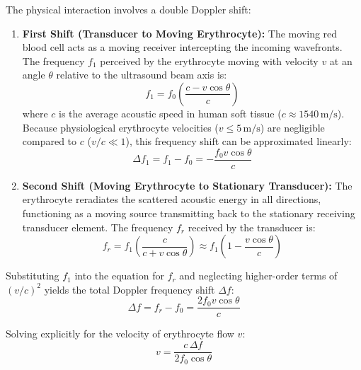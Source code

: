 \documentclass[11pt,a4paper]{article}
\begin{document}
The physical interaction involves a double Doppler shift:
\begin{enumerate}[leftmargin=*]
    \item \textbf{First Shift (Transducer to Moving Erythrocyte):} The moving red blood cell acts as a moving receiver intercepting the incoming wavefronts. The frequency $f_1$ perceived by the erythrocyte moving with velocity $v$ at an angle $\theta$ relative to the ultrasound beam axis is:
    \begin{equation}
        f_1 = f_0 \left( \frac{c - v \cos\theta}{c} \right)
    \end{equation}
    where $c$ is the average acoustic speed in human soft tissue ($c \approx 1540\,\text{m/s}$). Because physiological erythrocyte velocities ($v \le 5\,\text{m/s}$) are negligible compared to $c$ ($v/c \ll 1$), this frequency shift can be approximated linearly:
    \begin{equation}
        \Delta f_1 = f_1 - f_0 = - \frac{f_0 v \cos\theta}{c}
    \end{equation}

    \item \textbf{Second Shift (Moving Erythrocyte to Stationary Transducer):} The erythrocyte reradiates the scattered acoustic energy in all directions, functioning as a moving source transmitting back to the stationary receiving transducer element. The frequency $f_r$ received by the transducer is:
    \begin{equation}
        f_r = f_1 \left( \frac{c}{c + v \cos\theta} \right) \approx f_1 \left( 1 - \frac{v \cos\theta}{c} \right)
    \end{equation}
\end{enumerate}

Substituting $f_1$ into the equation for $f_r$ and neglecting higher-order terms of $(v/c)^2$ yields the total Doppler frequency shift $\Delta f$:
\begin{equation}
    \Delta f = f_r - f_0 = \frac{2 f_0 v \cos\theta}{c}
\end{equation}

Solving explicitly for the velocity of erythrocyte flow $v$:
\begin{equation}
    v = \frac{c \, \Delta f}{2 f_0 \cos\theta}
\end{equation}
\end{document}
